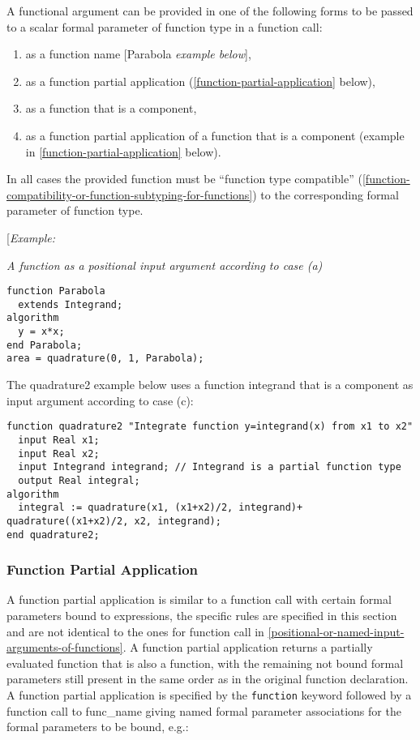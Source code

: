 A functional argument can be provided in one of the following forms to
be passed to a scalar formal parameter of function type in a function
call:

\begin{enumerate}
\def\labelenumi{\alph{enumi})}
\item
  as a function name {[}Parabola \emph{example below}{]},
\item
  as a function partial application (\autoref{function-partial-application} below),
\item
  as a function that is a component,
\item
  as a function partial application of a function that is a component
  (example in \autoref{function-partial-application} below).
\end{enumerate}

In all cases the provided function must be ``function type compatible''
(\autoref{function-compatibility-or-function-subtyping-for-functions}) to the corresponding formal parameter of function type.

{[}\emph{Example:}

\emph{A function as a positional input argument according to case (a)}

\begin{lstlisting}[language=modelica]
function Parabola
  extends Integrand;
algorithm
  y = x*x;
end Parabola;
area = quadrature(0, 1, Parabola);
\end{lstlisting}
The quadrature2 example below uses a function integrand that is a
component as input argument according to case (c):

\begin{lstlisting}[language=modelica]
  function quadrature2 "Integrate function y=integrand(x) from x1 to x2"
  input Real x1;
  input Real x2;
  input Integrand integrand; // Integrand is a partial function type
  output Real integral;
algorithm
  integral := quadrature(x1, (x1+x2)/2, integrand)+  quadrature((x1+x2)/2, x2, integrand);
end quadrature2;
\end{lstlisting}
\subsubsection{Function Partial Application}

A function partial application is similar to a function call with
certain formal parameters bound to expressions, the specific rules are
specified in this section and are not identical to the ones for function
call in \autoref{positional-or-named-input-arguments-of-functions}. A function partial application returns a partially
evaluated function that is also a function, with the remaining not bound
formal parameters still present in the same order as in the original
function declaration. A function partial application is specified by the
\lstinline!function! keyword followed by a function call to func\_name
giving named formal parameter associations for the formal parameters to
be bound, e.g.:

